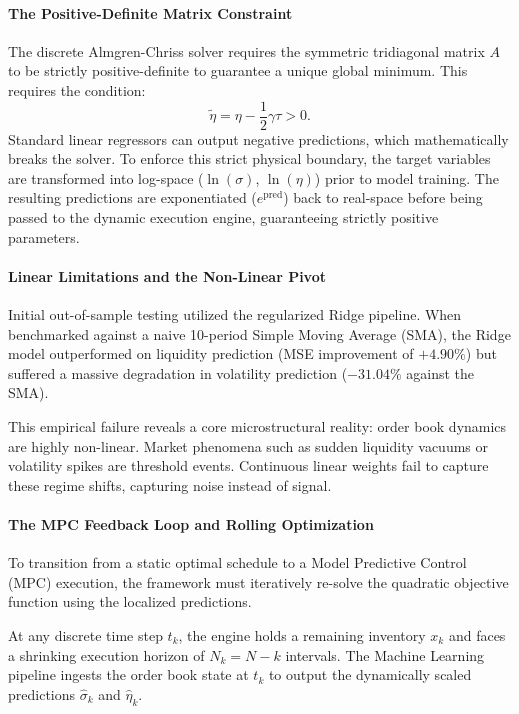 \documentclass[11pt,a4paper]{article}
\begin{document}
\paragraph{The Positive-Definite Matrix Constraint}
The discrete Almgren-Chriss solver requires the symmetric tridiagonal matrix $A$ to be strictly positive-definite to guarantee a unique global minimum. This requires the condition:
\[ \tilde{\eta} = \eta - \frac{1}{2}\gamma\tau > 0. \]
Standard linear regressors can output negative predictions, which mathematically breaks the solver. To enforce this strict physical boundary, the target variables are transformed into log-space ($\ln(\sigma)$, $\ln(\eta)$) prior to model training. The resulting predictions are exponentiated ($e^{\text{pred}}$) back to real-space before being passed to the dynamic execution engine, guaranteeing strictly positive parameters.

\paragraph{Linear Limitations and the Non-Linear Pivot}
Initial out-of-sample testing utilized the regularized Ridge pipeline. When benchmarked against a naive 10-period Simple Moving Average (SMA), the Ridge model outperformed on liquidity prediction (MSE improvement of $+4.90\%$) but suffered a massive degradation in volatility prediction ($-31.04\%$ against the SMA). 

This empirical failure reveals a core microstructural reality: order book dynamics are highly non-linear. Market phenomena such as sudden liquidity vacuums or volatility spikes are threshold events. Continuous linear weights fail to capture these regime shifts, capturing noise instead of signal.

\paragraph{The MPC Feedback Loop and Rolling Optimization}
To transition from a static optimal schedule to a Model Predictive Control (MPC) execution, the framework must iteratively re-solve the quadratic objective function using the localized predictions.

At any discrete time step $t_k$, the engine holds a remaining inventory $x_k$ and faces a shrinking execution horizon of $N_k = N - k$ intervals. The Machine Learning pipeline ingests the order book state at $t_k$ to output the dynamically scaled predictions $\hat{\sigma}_k$ and $\hat{\eta}_k$.
\end{document}
